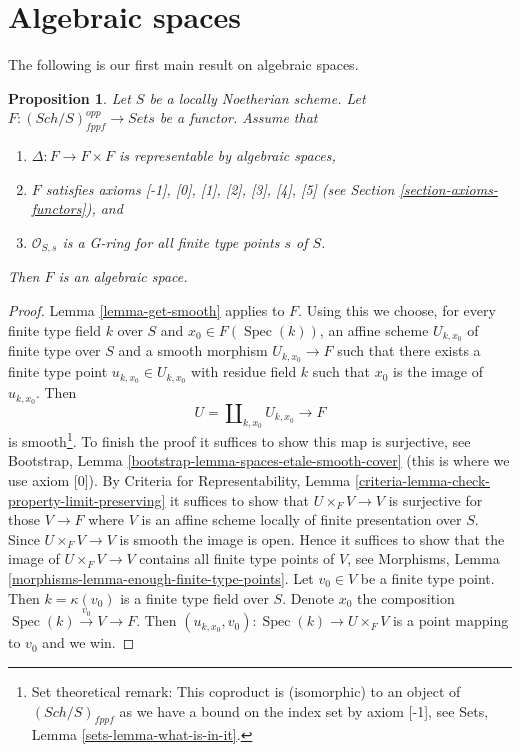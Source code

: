 \documentclass{stacks-project}
\theoremstyle{plain}
\newtheorem{proposition}[subsection]{Proposition}
\theoremstyle{definition}
\theoremstyle{remark}
\numberwithin{equation}{subsection}
\def\Spec{\mathop{\mathrm{Spec}}}
\def\Sch{\mathit{Sch}}
\begin{document}
\section{Algebraic spaces}
\label{section-algebraic-spaces}

\noindent
The following is our first main result on algebraic spaces.

\begin{proposition}
\label{proposition-spaces-diagonal-representable}
Let $S$ be a locally Noetherian scheme. Let
$F : (\Sch/S)_{fppf}^{opp} \to \textit{Sets}$ be a functor. Assume that
\begin{enumerate}
\item $\Delta : F \to F \times F$ is representable by algebraic spaces,
\item $F$ satisfies axioms [-1], [0], [1], [2], [3], [4], [5]
(see Section \ref{section-axioms-functors}), and
\item $\mathcal{O}_{S, s}$ is a G-ring for all finite type points $s$ of $S$.
\end{enumerate}
Then $F$ is an algebraic space.
\end{proposition}

\begin{proof}
Lemma \ref{lemma-get-smooth} applies to $F$. Using this we
choose, for every finite type field $k$ over $S$ and $x_0 \in F(\Spec(k))$,
an affine scheme $U_{k, x_0}$ of finite type over $S$ and a smooth morphism
$U_{k, x_0} \to F$ such that there exists a finite type point
$u_{k, x_0} \in U_{k, x_0}$ with residue field $k$ such that $x_0$
is the image of $u_{k, x_0}$. Then
$$
U = \coprod\nolimits_{k, x_0} U_{k, x_0} \longrightarrow F
$$
is smooth\footnote{Set theoretical remark: This coproduct is (isomorphic)
to an object of $(\Sch/S)_{fppf}$ as we have a bound on the index set
by axiom [-1], see Sets, Lemma \ref{sets-lemma-what-is-in-it}.}.
To finish the proof it suffices to show this map is surjective,
see Bootstrap, Lemma \ref{bootstrap-lemma-spaces-etale-smooth-cover}
(this is where we use axiom [0]). By Criteria for Representability, Lemma
\ref{criteria-lemma-check-property-limit-preserving}
it suffices to show that $U \times_F V \to V$ is surjective for those
$V \to F$ where $V$ is an affine scheme locally of finite presentation
over $S$. Since $U \times_F V \to V$ is smooth the image is open. Hence
it suffices to show that the image of $U \times_F V \to V$ contains all
finite type points of $V$, see
Morphisms, Lemma \ref{morphisms-lemma-enough-finite-type-points}.
Let $v_0 \in V$ be a finite type point. Then $k = \kappa(v_0)$ is
a finite type field over $S$. Denote $x_0$ the composition
$\Spec(k) \xrightarrow{v_0} V \to F$. Then
$(u_{k, x_0}, v_0) : \Spec(k) \to U \times_F V$ is a point mapping to
$v_0$ and we win.
\end{proof}
\end{document}
